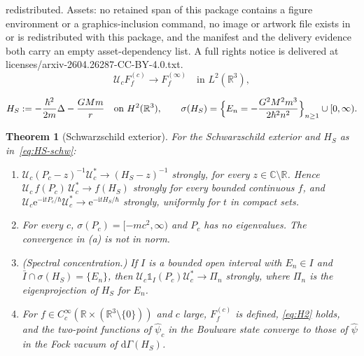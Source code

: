 \documentclass[10pt,a4paper]{amsart}
\newtheorem{theorem}{Theorem}
\theoremstyle{definition}
\theoremstyle{remark}
\newcommand{\R}{\mathbb{R}}
\newcommand{\C}{\mathbb{C}}
\newcommand{\one}{\mathds{1}}
\newcommand{\rmd}{\mathrm{d}}
\newcommand{\rmi}{\mathrm{i}}
\newcommand{\rme}{\mathrm{e}}
\begin{document}
redistributed. Assets: no retained span of this package contains a figure environment or a graphics-inclusion command, no image or artwork file exists in or is redistributed with this package, and the manifest and the delivery evidence both carry an empty asset-dependency list. A full rights notice is delivered at licenses/arxiv-2604.26287-CC-BY-4.0.txt.
\setcounter{equation}{12}
\begin{equation}\label{eq:H2}
\mathcal{U}_cF_f^{(c)}\longrightarrow F_f^{(\infty)}\quad\text{in }
L^2(\R^3),
\end{equation}

\setcounter{equation}{22}
\setcounter{theorem}{1}
\begin{equation}\label{eq:HS-schw}
H_S:=-\frac{\hbar^2}{2m}\Delta-\frac{GMm}{r}\quad\text{on }H^2(\R^3),
\qquad \sigma(H_S)=\Bigl\{E_n=-\frac{G^2M^2m^3}{2\hbar^2n^2}\Bigr\}_{n\geq1}
\cup[0,\infty).
\end{equation}

\begin{theorem}[Schwarzschild exterior]\label{thm:schw}
For the Schwarzschild exterior and $H_S$ as in~\eqref{eq:HS-schw}:
\begin{enumerate}[label=(\alph*)]
\item $\mathcal{U}_c(P_c-z)^{-1}\mathcal{U}_c^*\to(H_S-z)^{-1}$ strongly,
for every $z\in\C\setminus\R$. Hence $\mathcal{U}_c\,f(P_c)\,
\mathcal{U}_c^*\to f(H_S)$ strongly for every bounded continuous $f$,
and $\mathcal{U}_c\rme^{-\rmi tP_c/\hbar}\mathcal{U}_c^*\to
\rme^{-\rmi tH_S/\hbar}$ strongly, uniformly for $t$ in compact sets.
\item For every $c$, $\sigma(P_c)=[-mc^2,\infty)$ and $P_c$ has no
eigenvalues. The convergence in (a) is not in norm.
\item (Spectral concentration.) If $I$ is a bounded open interval with
$E_n\in I$ and $\bar I\cap\sigma(H_S)=\{E_n\}$, then $\mathcal{U}_c\one_I(P_c)
\mathcal{U}_c^*\to\Pi_n$ strongly, where $\Pi_n$ is the eigenprojection
of $H_S$ for $E_n$.
\item For $f\in C_c^\infty(\R\times(\R^3\setminus\{0\}))$ and $c$ large,
$F_f^{(c)}$ is defined, \eqref{eq:H2} holds, and the two-point functions
of $\hat\psi_c$ in the Boulware state converge to those of $\hat\psi$ in
the Fock vacuum of $\rmd\Gamma(H_S)$.
\end{enumerate}
\end{theorem}
\end{document}
